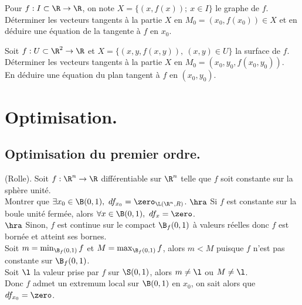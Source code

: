\documentclass[11pt]{article}
\begin{document}
\begin{exercice}{}{}
    Pour $f:I\subset\R\to\R$, on note $X=\{(x,f(x)); ~ x\in I\}$ le graphe de $f$.\\
    Déterminer les vecteurs tangents à la partie $X$ en $M_0 = (x_0,f(x_0))\in X$ et en déduire une équation de la tangente à $f$ en $x_0$.
\end{exercice}

\begin{exercice}{}{}
    Soit $f:U\subset\R^2\to\R$ et $X=\{(x,y,f(x,y)), ~ (x,y)\in U\}$ la surface de $f$.\\
    Déterminer les vecteurs tangents à la partie $X$ en $M_0 = (x_0,y_0, f(x_0,y_0))$.\\
    En déduire une équation du plan tangent à $f$ en $(x_0,y_0)$.
\end{exercice}

\section{Optimisation.}

\subsection{Optimisation du premier ordre.}

\begin{exercice}{(Rolle).}{}
    Soit $f:\R^n\to\R$ différentiable sur $\R^n$ telle que $f$ soit constante sur la sphère unité.\\
    Montrer que $\exists x_0 \in \B(0,1), ~ df_{x_0}=\zero_{\L(\R^n,R)}$.
    \tcblower
    $\hra$ Si $f$ est constante sur la boule unité fermée, alors $\forall x \in \B(0,1), ~ df_x=\zero$.\\
    $\hra$ Sinon, $f$ est continue sur le compact $\B_f(0,1)$ à valeurs réelles donc $f$ est bornée et atteint ses bornes.\\
    Soit $m=\min_{\B_f(0,1)}f$ et $M=\max_{\B_f(0,1)}f$, alors $m<M$ puisque $f$ n'est pas constante sur $\B_f(0,1)$.\\
    Soit $\l$ la valeur prise par $f$ sur $\S(0,1)$, alors $m\neq\l$ ou $M\neq\l$.\\
    Donc $f$ admet un extremum local sur $\B(0,1)$ en $x_0$, on sait alors que $df_{x_0}=\zero$.
\end{exercice}
\end{document}

